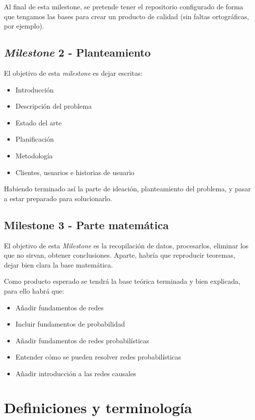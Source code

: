 Al final de esta milestone, se pretende tener el repositorio configurado de forma que tengamos las 
bases para crear un producto de calidad (sin faltas ortográficas, por ejemplo).

\subsection{\textit{Milestone} 2 - Planteamiento}
El objetivo de esta \textit{milestone} es dejar escritas:

\begin{itemize}
    \item Introducción
    \item Descripción del problema
    \item Estado del arte
    \item Planificación
    \item Metodología
    \item Clientes, usuarios e historias de usuario
\end{itemize}

Habiendo terminado así la parte de ideación, planteamiento del problema, y pasar a estar preparado para solucionarlo.

\subsection{Milestone 3 - Parte matemática} 
El objetivo de esta \textit{Milestone} es la recopilación de datos, procesarlos, eliminar los que 
no sirvan, obtener conclusiones. Aparte, habría que reproducir teoremas, dejar bien clara la base matemática.

Como producto esperado se tendrá la base teórica terminada y bien explicada, para ello habrá que: 

\begin{itemize}
    \item Añadir fundamentos de redes
    \item Incluir fundamentos de probabilidad 
    \item Añadir fundamentos de redes probabilísticas 
    \item Entender cómo se pueden resolver redes probabilísticas 
    \item Añadir introducción a las redes causales 
\end{itemize}

 

\section{Definiciones y terminología}

